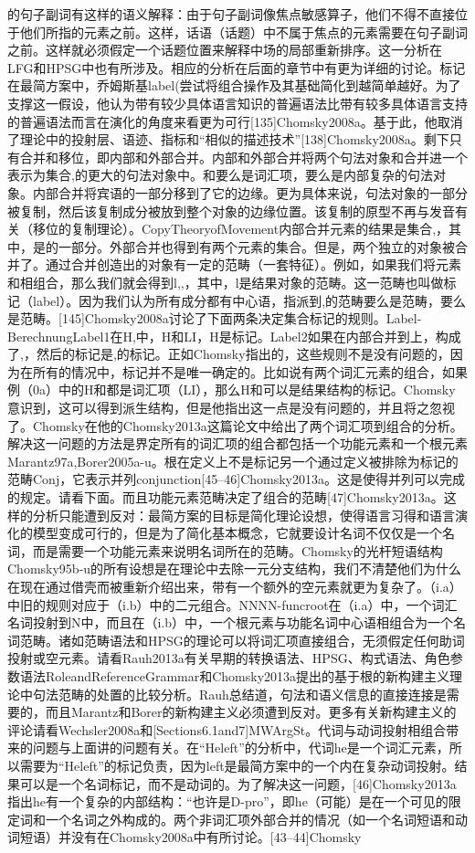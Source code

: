 的句子副词有这样的语义解释：由于句子副词像焦点敏感算子，他们不得不直接位于他们所指的元素之前。这样，话语（话题）中不属于焦点的元素需要在句子副词之前。这样就必须假定一个话题位置来解释中场的局部重新排序。这一分析在LFG和HPSG中也有所涉及。相应的分析在后面的章节中有更为详细的讨论。标记在最简方案中，乔姆斯基label(尝试将组合操作及其基础简化到越简单越好。为了支撑这一假设，他认为带有较少具体语言知识的普遍语法比带有较多具体语言支持的普遍语法而言在演化的角度来看更为可行[135]Chomsky2008a。基于此，他取消了理论中的投射层、语迹、指标和“相似的描述技术”[138]Chomsky2008a。剩下只有合并和移位，即内部和外部合并。内部和外部合并将两个句法对象和合并进一个表示为集合,的更大的句法对象中。和要么是词汇项，要么是内部复杂的句法对象。内部合并将宾语的一部分移到了它的边缘。更为具体来说，句法对象的一部分被复制，然后该复制成分被放到整个对象的边缘位置。该复制的原型不再与发音有关（移位的复制理论）。CopyTheoryofMovement内部合并元素的结果是集合,，其中，是的一部分。外部合并也得到有两个元素的集合。但是，两个独立的对象被合并了。通过合并创造出的对象有一定的范畴（一套特征）。例如，如果我们将元素和相组合，那么我们就会得到l,,，其中，l是结果对象的范畴。这一范畴也叫做标记（label）。因为我们认为所有成分都有中心语，指派到,的范畴要么是范畴，要么是范畴。[145]Chomsky2008a讨论了下面两条决定集合标记的规则。Label-BerechnungLabel1在H,中，H和LI，H是标记。Label2如果在内部合并到上，构成了,，然后的标记是,的标记。正如Chomsky指出的，这些规则不是没有问题的，因为在所有的情况中，标记并不是唯一确定的。比如说有两个词汇元素的组合，如果例（0a）中的H和都是词汇项（LI），那么H和可以是结果结构的标记。Chomsky意识到，这可以得到派生结构，但是他指出这一点是没有问题的，并且将之忽视了。Chomsky在他的Chomsky2013a这篇论文中给出了两个词汇项到组合的分析。解决这一问题的方法是界定所有的词汇项的组合都包括一个功能元素和一个根元素Marantz97a,Borer2005a-u。根在定义上不是标记另一个通过定义被排除为标记的范畴Conj，它表示并列conjunction[45--46]Chomsky2013a。这是使得并列可以完成的规定。请看下面。而且功能元素范畴决定了组合的范畴[47]Chomsky2013a。这样的分析只能遭到反对：最简方案的目标是简化理论设想，使得语言习得和语言演化的模型变成可行的，但是为了简化基本概念，它就要设计名词不仅仅是一个名词，而是需要一个功能元素来说明名词所在的范畴。Chomsky的光杆短语结构Chomsky95b-u的所有设想是在理论中去除一元分支结构，我们不清楚他们为什么在现在通过借壳而被重新介绍出来，带有一个额外的空元素就更为复杂了。（i.a）中旧的规则对应于（i.b）中的二元组合。NNNN-funcroot在（i.a）中，一个词汇名词投射到N中，而且在（i.b）中，一个根元素与功能名词中心语相组合为一个名词范畴。诸如范畴语法和HPSG的理论可以将词汇项直接组合，无须假定任何助词投射或空元素。请看Rauh2013a有关早期的转换语法、HPSG、构式语法、角色参数语法RoleandReferenceGrammar和Chomsky2013a提出的基于根的新构建主义理论中句法范畴的处置的比较分析。Rauh总结道，句法和语义信息的直接连接是需要的，而且Marantz和Borer的新构建主义必须遭到反对。更多有关新构建主义的评论请看Wechsler2008a和[Sections6.1and7]MWArgSt。代词与动词投射相组合带来的问题与上面讲的问题有关。在“Heleft”的分析中，代词he是一个词汇元素，所以需要为“Heleft”的标记负责，因为left是最简方案中的一个内在复杂动词投射。结果可以是一个名词标记，而不是动词的。为了解决这一问题，[46]Chomsky2013a指出he有一个复杂的内部结构：“也许是D-pro”，即he（可能）是在一个可见的限定词和一个名词之外构成的。两个非词汇项外部合并的情况（如一个名词短语和动词短语）并没有在Chomsky2008a中有所讨论。[43--44]Chomsky
